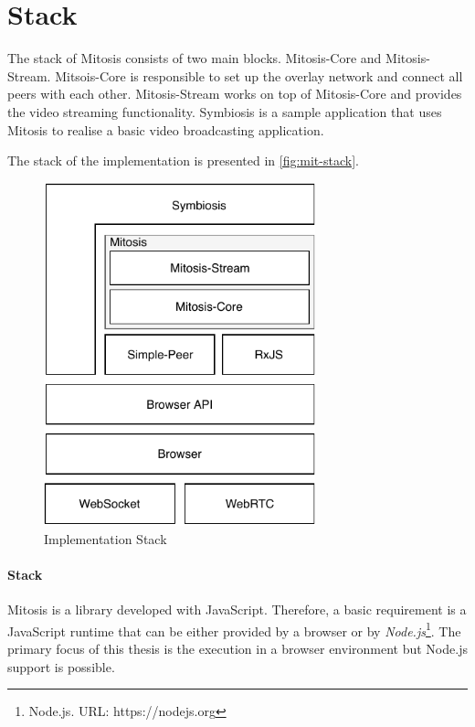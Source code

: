 \section{Stack}
The stack of Mitosis consists of two main blocks. Mitosis-Core and Mitosis-Stream. Mitsois-Core is responsible to set up the overlay network and connect all peers with each other. Mitosis-Stream works on top of Mitosis-Core and provides the video streaming functionality.
Symbiosis is a sample application that uses Mitosis to realise a basic video broadcasting application.

The stack of the implementation is presented in \vref{fig:mit-stack}.

\begin{figure}
\centering
\includegraphics[width=0.7\textwidth]{graphics/implementation/mitosis-overall.pdf}
\caption{Implementation Stack}
\label{fig:mit-stack}
\end{figure}

\paragraph{Stack}
Mitosis is a library developed with JavaScript. Therefore, a basic requirement is a JavaScript runtime that can be either provided by a browser or by \textit{Node.js}\footnote{Node.js. URL: {https://nodejs.org}}. The primary focus of this thesis is the execution in a browser environment but Node.js support is possible.

